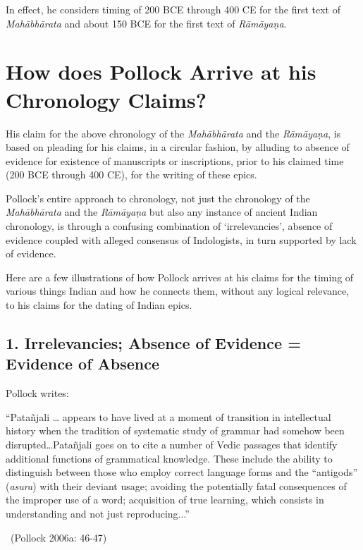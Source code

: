 In effect, he considers timing of 200 BCE through 400 CE for the first text of \textit{Mahābhārata} and about 150 BCE for the first text of \textit{Rāmāyaṇa}.


\section*{How does Pollock Arrive at his Chronology Claims?}

His claim for the above chronology of the \textit{Mahābhārata} and the \textit{Rāmāyaṇa}, is based on pleading for his claims, in a circular fashion, by alluding to absence of evidence for existence of manuscripts or inscriptions, prior to his claimed time (200 BCE through 400 CE), for the writing of these epics.

Pollock’s entire approach to chronology, not just the chronology of the \textit{Mahābhārata} and the \textit{Rāmāyaṇa} but also any instance of ancient Indian chronology, is through a confusing combination of ‘irrelevancies’, absence of evidence coupled with alleged consensus of Indologists, in turn supported by lack of evidence.

Here are a few illustrations of how Pollock arrives at his claims for the timing of various things Indian and how he connects them, without any logical relevance, to his claims for the dating of Indian epics.

\subsection*{1. Irrelevancies; \hfill\break Absence of Evidence = Evidence of Absence}

Pollock writes:

\begin{myquote}
“Patañjali … appears to have lived at a moment of transition in intellectual history when the tradition of systematic study of grammar had somehow been disrupted…Patañjali goes on to cite a number of Vedic passages that identify additional functions of grammatical knowledge. These include the ability to distinguish between those who employ correct language forms and the “antigods” (\textit{asura}) with their deviant usage; avoiding the potentially fatal consequences of the improper use of a word; acquisition of true learning, which consists in understanding and not just reproducing...” 

~\hfill (Pollock 2006a: 46-47)
\end{myquote}

